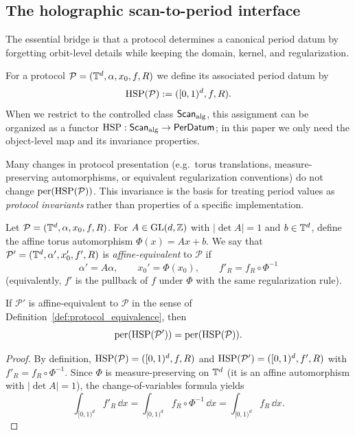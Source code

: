 \subsection{The holographic scan-to-period interface}
\label{sec:prelim_hsp}

The essential bridge is that a protocol determines a canonical period datum by forgetting orbit-level details while keeping the domain, kernel, and regularization.

\begin{definition}
\label{def:hsp}
For a protocol $\mathcal{P}=(\mathbb{T}^d,\alpha,x_0,f,R)$ we define its associated period datum by
\[
\mathrm{HSP}(\mathcal{P}) := ([0,1)^d,f,R).
\]
When we restrict to the controlled class $\mathsf{Scan}_{\mathrm{alg}}$, this assignment can be organized as a functor $\mathrm{HSP}:\mathsf{Scan}_{\mathrm{alg}}\to\mathsf{PerDatum}$; in this paper we only need the object-level map and its invariance properties.
\end{definition}

\begin{remark}
\label{rem:protocol_equivalence}
Many changes in protocol presentation (e.g.\ torus translations, measure-preserving automorphisms, or equivalent regularization conventions) do not change $\mathrm{per}(\mathrm{HSP}(\mathcal{P}))$.
This invariance is the basis for treating period values as \emph{protocol invariants} rather than properties of a specific implementation.
\end{remark}

\begin{definition}
\label{def:protocol_equivalence}
Let $\mathcal{P}=(\mathbb{T}^d,\alpha,x_0,f,R)$.
For $A\in \mathrm{GL}(d,\mathbb{Z})$ with $|\det A|=1$ and $b\in\mathbb{T}^d$, define the affine torus automorphism $\Phi(x)=Ax+b$.
We say that $\mathcal{P}'=(\mathbb{T}^d,\alpha',x_0',f',R)$ is \emph{affine-equivalent} to $\mathcal{P}$ if
\[
\alpha'=A\alpha,\qquad x_0'=\Phi(x_0),\qquad f'_R = f_R\circ \Phi^{-1}
\]
(equivalently, $f'$ is the pullback of $f$ under $\Phi$ with the same regularization rule).
\end{definition}

\begin{lemma}
\label{lem:period_invariance_affine}
If $\mathcal{P}'$ is affine-equivalent to $\mathcal{P}$ in the sense of Definition~\ref{def:protocol_equivalence}, then
\[
\mathrm{per}(\mathrm{HSP}(\mathcal{P}'))=\mathrm{per}(\mathrm{HSP}(\mathcal{P})).
\]
\end{lemma}

\begin{proof}
By definition, $\mathrm{HSP}(\mathcal{P})=([0,1)^d,f,R)$ and $\mathrm{HSP}(\mathcal{P}')=([0,1)^d,f',R)$ with $f'_R=f_R\circ \Phi^{-1}$.
Since $\Phi$ is measure-preserving on $\mathbb{T}^d$ (it is an affine automorphism with $|\det A|=1$),
the change-of-variables formula yields
\[
\int_{[0,1)^d} f'_R\,\dd x=\int_{[0,1)^d} f_R\circ \Phi^{-1}\,\dd x=\int_{[0,1)^d} f_R\,\dd x.
\]
\end{proof}


